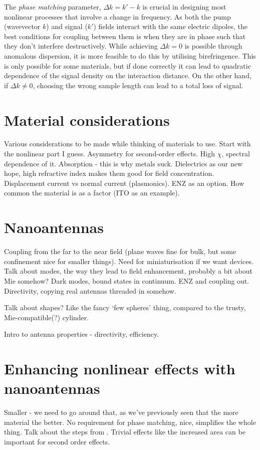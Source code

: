 \documentclass[12pt,a4paper]{article}
\begin{document}
The \emph{phase matching} parameter, $\Delta k = k'-k$ is crucial in designing most nonlinear processes that involve a change in frequency\cite{boydNonlinearOptics2008}. As both the pump (wavevector $k$) and signal ($k'$) fields interact with the same electric dipoles, the best conditions for coupling between them is when they are in phase such that they don't interfere destructively. While achieving $\Delta k=0$ is possible through anomalous dispersion, it is more feasible to do this by utilising birefringence. This is only possible for some materials, but if done correctly it can lead to quadratic dependence of the signal density on the interaction distance. On the other hand, if $\Delta k\neq 0$, choosing the wrong sample length can lead to a total loss of signal.

\section{Material considerations}
Various considerations to be made while thinking of materials to use. Start with the nonlinear part I guess. Asymmetry for second-order effects. High $\chi$, spectral dependence of it. Absorption - this is why metals suck. Dielectrics as our new hope, high refractive index makes them good for field concentration. Displacement current vs normal current (plasmonics). ENZ as an option. How common the material is as a factor (ITO as an example).

\section{Nanoantennas}
Coupling from the far to the near field (plane waves fine for bulk, but some confinement nice for smaller things). Need for miniaturisation if we want devices. Talk about modes, the way they lead to field enhancement, probably a bit about Mie somehow? Dark modes, bound states in continuum. ENZ and coupling out. Directivity, copying real antennas threaded in somehow.

Talk about shapes? Like the fancy `few spheres' thing, compared to the trusty, Mie-compatible(?) cylinder.

Intro to antenna properties - directivity, efficiency.

\section{Enhancing nonlinear effects with nanoantennas}
Smaller - we need to go around that, as we've previously seen that the more material the better. No requirement for phase matching, nice, simplifies the whole thing. Talk about the steps from \cite{koshelevSubwavelengthDielectricResonators2020}. Trivial effects like the increased area can be important for second order effects.
\end{document}
